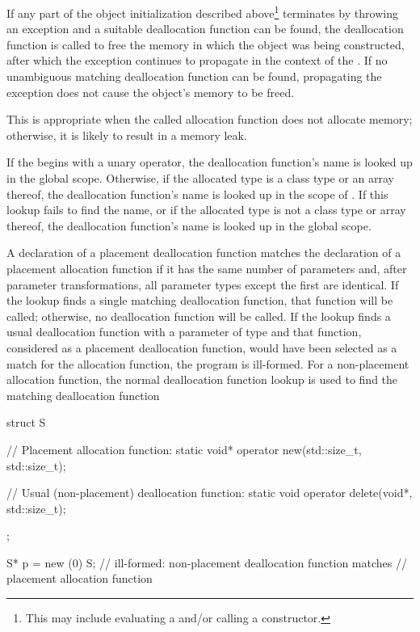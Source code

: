 \pnum
{}%
If any part of the object initialization described above\footnote{This may
include evaluating a  and/or calling
a constructor.}
terminates by throwing an exception and a suitable deallocation function
can be found, the deallocation function is called to free the memory in
which the object was being constructed, after which the exception
continues to propagate in the context of the .
If no unambiguous matching deallocation function can be found,
propagating the exception does not cause the object's memory to be
freed.
\begin{note}
This is appropriate when the called allocation function does not
allocate memory; otherwise, it is likely to result in a memory leak.
\end{note}

\pnum
If the  begins with a unary \tcode{::}
operator, the deallocation function's name is looked up in the global
scope. Otherwise, if the allocated type is a class type  or an
array thereof, the deallocation function's name is looked up in the
scope of . If this lookup fails to find the name, or if the
allocated type is not a class type or array thereof, the deallocation
function's name is looked up in the global scope.

\pnum
A declaration of a placement deallocation function matches the
declaration of a placement allocation function if it has the same number
of parameters and, after parameter transformations, all
parameter types except the first are identical. If
the lookup finds a single matching deallocation function, that function
will be called; otherwise, no deallocation function will be called. If
the lookup finds a usual deallocation
function
with a parameter of type 
and that function,
considered as a placement deallocation function, would have been
selected as a match for the allocation function, the program is
ill-formed. For a non-placement allocation function, the normal deallocation
function lookup is used to find the matching deallocation
function
\begin{example}

\begin{codeblock}
struct S {
  // Placement allocation function:
  static void* operator new(std::size_t, std::size_t);

  // Usual (non-placement) deallocation function:
  static void operator delete(void*, std::size_t);
};

S* p = new (0) S;   // ill-formed: non-placement deallocation function matches
                    // placement allocation function
\end{codeblock}

\end{example}

